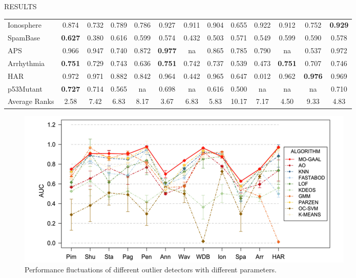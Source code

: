 \documentclass[final]{beamer}
\newlength{\colwidth}
\begin{document}
\begin{frame}[t]
\begin{columns}[t]
\begin{column}{\colwidth}
\begin{block}{RESULTS}
\begin{table}
{\begin{tabular}{lcccccccccccc}
        Ionosphere & 0.874 & 0.732 & 0.789 & 0.786 & 0.927 & 0.911 & 0.904 & 0.655 & 0.922 & 0.912 & 0.752 & \textbf{0.929}\\
        SpamBase & \textbf{0.627} & 0.380 & 0.616 & 0.599 & 0.574 & 0.432 & 0.503 & 0.571 & 0.549 & 0.599 & 0.590 & 0.578 \\
        APS & 0.966 & 0.947 & 0.740 & 0.872 & \textbf{0.977} & na & 0.865 & 0.785 & 0.790 & na & 0.537 & 0.972 \\
        Arrhythmia & \textbf{0.751} & 0.729 & 0.743 & 0.636 & \textbf{0.751} & 0.742 & 0.737 & 0.539 & 0.473 & \textbf{0.751} & 0.707 & 0.746 \\
        HAR & 0.972 & 0.971 & 0.882 & 0.842 & 0.964 & 0.442 & 0.965 & 0.647 & 0.012 & 0.962 & \textbf{0.976} & 0.969 \\
        p53Mutant & \textbf{0.727} & 0.714 & 0.565 & na & 0.698 & na & 0.616 & 0.500 & na & na & na & 0.710 \\
        Average Ranks & 2.58 & 7.42 & 6.83 & 8.17 & 3.67 & 6.83 & 5.83 & 10.17 & 7.17 & 4.50 & 9.33 & 4.83 \\ 
        \bottomrule
      \end{tabular}}
  	  \label{table:result}
    \end{table}
	
	 \begin{figure}
		\centering
		\includegraphics[scale=2]{figures/Result.png}
		\caption{Performance fluctuations of different outlier detectors with different parameters.}
	\end{figure}
	

\end{block}
\end{column}
\end{columns}
\end{frame}
\end{document}
